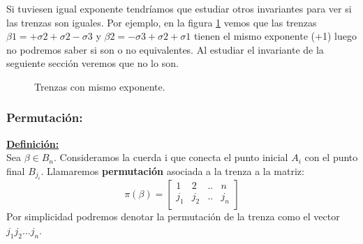 \documentclass[14pt]{extarticle}
\begin{document}
Si tuviesen igual exponente tendríamos que estudiar otros invariantes para ver si las trenzas son iguales. Por ejemplo, en la figura \ref{exp3} vemos que las trenzas $\beta1 = +\sigma2+\sigma2-\sigma3$ y $\beta2 = -\sigma3+\sigma2+\sigma1$ tienen el mismo exponente (+1) luego no podremos saber si son o no equivalentes. Al estudiar el invariante de la seguiente sección veremos que no lo son.  \\
	\begin{figure}[h!]
		\centering
		\caption{Trenzas con mismo exponente.}
		\label{exp3} 
	\end{figure}

\bigskip
\subsubsection{Permutación:}\label{invtren2}
\textbf{\underline{Definición:}}\\
Sea $\beta \in B_{n}$. Consideramos la cuerda i que conecta el punto inicial $ A_{i}$ con el punto final $B_{j_{i}}$. Llamaremos \textbf{permutación} asociada a la trenza a la matriz:\\
\[\pi(\beta)=\begin{bmatrix}
1 & 2 & .. & n\\
j_{1} & j_{2} & .. & j_{n} \\
\end{bmatrix}\]
Por simplicidad podremos denotar la permutación de la trenza como el vector $j_{1} j_{2} ... j_{n}$.\\
\end{document}
